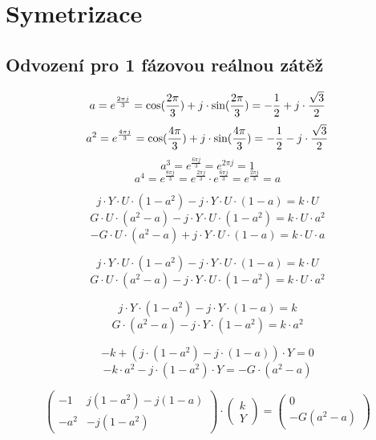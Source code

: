 \documentclass{article}
\begin{document}
\maketitle
\tableofcontents
\newpage



\section{Symetrizace \spicy \spicy}


\subsection{Odvození pro 1 fázovou reálnou zátěž \spicy \spicy \spicy \spicy}
$$
    a = e^{\frac{2 \pi j}{3}} = \textrm{cos}(\frac{2 \pi}{3}) + j \cdot \textrm{sin}(\frac{2 \pi}{3}) = -\frac{1}{2} + j \cdot \frac{\sqrt{3}}{2}
$$
$$
    a^2 = e^{\frac{4 \pi j}{3}} = \textrm{cos}(\frac{4 \pi}{3}) + j \cdot \textrm{sin}(\frac{4 \pi}{3}) = -\frac{1}{2} - j \cdot \frac{\sqrt{3}}{2}
$$
$$
    a^3 = e^{\frac{6 \pi j}{3}} = e^{2 \pi j} = 1
$$
$$
    a^4 = e^{\frac{8 \pi j}{3}} = e^{\frac{2 \pi j}{3}} \cdot e^{\frac{6 \pi j}{3}} = e^{\frac{2 \pi j}{3}} = a
$$

$$
    j \cdot Y \cdot U \cdot (1 - a^2) - j \cdot Y \cdot U \cdot (1 - a) = k \cdot U
$$
$$
    G \cdot U \cdot (a^2 - a) - j \cdot Y \cdot U \cdot (1 - a^2) = k \cdot U \cdot a^2
$$
$$
    -G \cdot U \cdot (a^2 - a) + j \cdot Y \cdot U \cdot (1 - a) = k \cdot U \cdot a
$$

$$
    j \cdot Y \cdot U \cdot (1 - a^2) - j \cdot Y \cdot U \cdot (1 - a) = k \cdot U
$$
$$
    G \cdot U \cdot (a^2 - a) - j \cdot Y \cdot U \cdot (1 - a^2) = k \cdot U \cdot a^2
$$

$$
    j \cdot Y \cdot (1 - a^2) - j \cdot Y \cdot (1 - a) = k
$$
$$
    G \cdot (a^2 - a) - j \cdot Y \cdot (1 - a^2) = k \cdot a^2
$$

$$
    -k + \left( j \cdot (1 - a^2) - j \cdot (1 - a) \right) \cdot Y = 0
$$
$$
    -k \cdot a^2 - j \cdot (1 - a^2) \cdot Y = -G \cdot (a^2 - a)
$$

$$
    \begin{pmatrix}
        -1   & j (1 - a^2) - j (1 - a) \\
        -a^2 & - j (1 - a^2)
    \end{pmatrix}
    \cdot
    \begin{pmatrix}
        k \\
        Y
    \end{pmatrix}
    =
    \begin{pmatrix}
        0 \\
        -G (a^2 - a)
    \end{pmatrix}
$$
\end{document}
